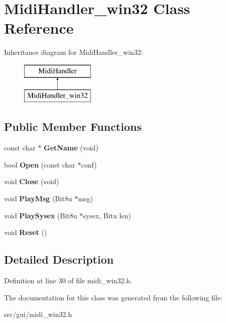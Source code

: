 \hypertarget{classMidiHandler__win32}{\section{Midi\-Handler\-\_\-win32 Class Reference}
\label{classMidiHandler__win32}
}
Inheritance diagram for Midi\-Handler\-\_\-win32\-:\begin{figure}[H]
\begin{center}
\leavevmode
\includegraphics[height=2.000000cm]{classMidiHandler__win32}
\end{center}
\end{figure}
\subsection*{Public Member Functions}
\begin{DoxyCompactItemize}
\item 
\hypertarget{classMidiHandler__win32_a5b4af7f36d2638509e870f5b72b3b190}{const char $\ast$ {\bfseries Get\-Name} (void)}\label{classMidiHandler__win32_a5b4af7f36d2638509e870f5b72b3b190}

\item 
\hypertarget{classMidiHandler__win32_a90f21afb6eda39990ffecdc90e31570f}{bool {\bfseries Open} (const char $\ast$conf)}\label{classMidiHandler__win32_a90f21afb6eda39990ffecdc90e31570f}

\item 
\hypertarget{classMidiHandler__win32_a37dd3a1fa0f368e13f2d8c4bb4721073}{void {\bfseries Close} (void)}\label{classMidiHandler__win32_a37dd3a1fa0f368e13f2d8c4bb4721073}

\item 
\hypertarget{classMidiHandler__win32_ac678ddce9e90e90c440f98183e2700fc}{void {\bfseries Play\-Msg} (Bit8u $\ast$msg)}\label{classMidiHandler__win32_ac678ddce9e90e90c440f98183e2700fc}

\item 
\hypertarget{classMidiHandler__win32_ad6f9427698e97a9c25067025bd664744}{void {\bfseries Play\-Sysex} (Bit8u $\ast$sysex, Bitu len)}\label{classMidiHandler__win32_ad6f9427698e97a9c25067025bd664744}

\item 
\hypertarget{classMidiHandler__win32_ae1bd698612dfc220b2cb6dd36acd51fa}{void {\bfseries Reset} ()}\label{classMidiHandler__win32_ae1bd698612dfc220b2cb6dd36acd51fa}

\end{DoxyCompactItemize}


\subsection{Detailed Description}


Definition at line 30 of file midi\-\_\-win32.\-h.



The documentation for this class was generated from the following file\-:\begin{DoxyCompactItemize}
\item 
src/gui/midi\-\_\-win32.\-h\end{DoxyCompactItemize}
